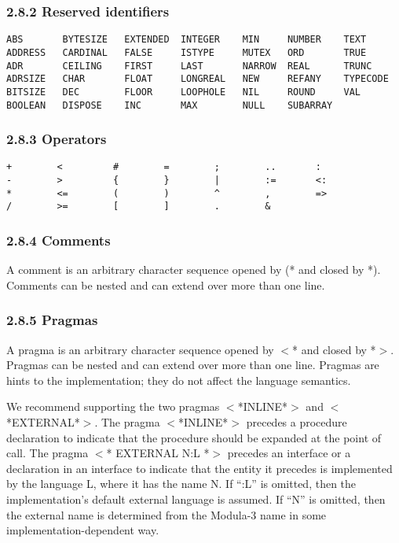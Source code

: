 \documentclass[10pt]{article}
\begin{document}
\subsubsection*{2.8.2 Reserved identifiers}

\begin{verbatim}
ABS       BYTESIZE   EXTENDED  INTEGER    MIN     NUMBER    TEXT
ADDRESS   CARDINAL   FALSE     ISTYPE     MUTEX   ORD       TRUE
ADR       CEILING    FIRST     LAST       NARROW  REAL      TRUNC
ADRSIZE   CHAR       FLOAT     LONGREAL   NEW     REFANY    TYPECODE
BITSIZE   DEC        FLOOR     LOOPHOLE   NIL     ROUND     VAL
BOOLEAN   DISPOSE    INC       MAX        NULL    SUBARRAY
\end{verbatim}

\subsubsection*{2.8.3 Operators}

\begin{verbatim}
+        <         #        =        ;        ..       :
-        >         {        }        |        :=       <:
*        <=        (        )        ^        ,        =>
/        >=        [        ]        .        &
\end{verbatim}

\subsubsection*{2.8.4 Comments}

A comment is an arbitrary character sequence opened by (* and closed by
*). Comments can be nested and can extend over more than one line.

\subsubsection*{2.8.5 Pragmas}

A pragma is an arbitrary character sequence opened by $<$* and closed by
*$>$. Pragmas can be nested and can extend over more than one line. Pragmas
are hints to the implementation; they do not affect the language semantics.

We recommend supporting the two pragmas $<$*INLINE*$>$ and $<$*EXTERNAL*$>$.
The pragma $<$*INLINE*$>$ precedes a procedure declaration to indicate that
the procedure should be expanded at the point of call. The pragma $<$*
EXTERNAL N:L *$>$ precedes an interface or a declaration in an interface to
indicate that the entity it precedes is implemented by the language L, where
it has the name N. If ``:L'' is omitted, then the implementation's default
external language is assumed. If ``N'' is omitted, then the external name is
determined from the Modula-3 name in some implementation-dependent way.
\end{document}
